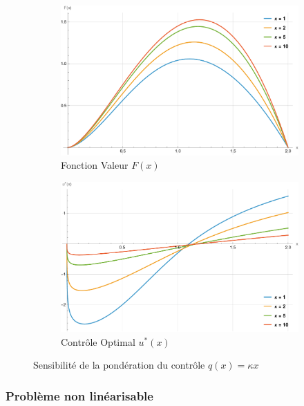 \FloatBarrier\begin{figure}[htb]
    \centering
    \begin{subfigure}{0.49\linewidth}
        \includegraphics[width=\linewidth]{img/validation/P2/p2_K_value.pdf}
        \caption{Fonction Valeur $F(x)$}\label{fig:KappaValueVisualisation2}
    \end{subfigure}
    \hfill
    \begin{subfigure}{0.49\linewidth}
        \includegraphics[width=\linewidth]{img/validation/P2/p2_K_control.pdf}
        \caption{Contrôle Optimal $u^*(x)$}\label{fig:KappaControlVisualisation2}
    \end{subfigure}
    \caption{Sensibilité de la pondération du contrôle $q(x)=\kappa x$}\label{fig:KappaValueControlComparison2}
\end{figure}
\FloatBarrier\subsubsection{Problème non linéarisable}\phantom{}\\
